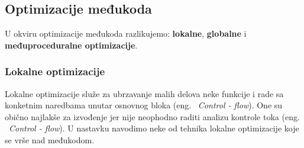\documentclass[a4paper]{article}
\begin{document}
\subsection{Optimizacije međukoda}
\label{subsec:optimizacija_međukod}
U okviru optimizacije međukoda razlikujemo: \textbf{lokalne}, \textbf{globalne} i \textbf{međuproceduralne optimizacije}.

\subsubsection{Lokalne optimizacije}
\label{subsubsec:lokalne}
Lokalne optimizacije služe za ubrzavanje malih delova neke funkcije i rade sa konketnim naredbama unutar osnovnog bloka (eng. ~{\em  Control - flow}).
One su obično najlakše za izvođenje jer nije neophodno raditi analizu kontrole toka (eng. ~{\em  Control - flow}).  
U nastavku navodimo neke od tehnika lokalne optimizacije koje se vrše nad međukodom. 
\end{document}

